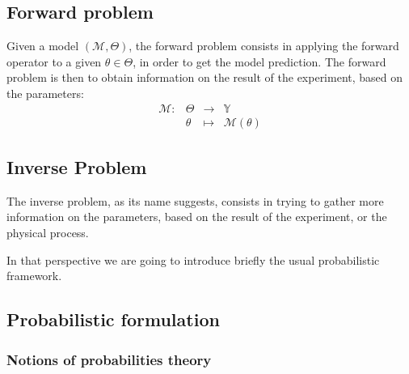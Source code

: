 \documentclass[a4paper,11pt]{article}
\newcommand{\Yspace}{\mathbb{Y}}
\theoremstyle{defi}
\numberwithin{thmCounter}{section}
\begin{document}
\subsection{Forward problem}
Given a model $(\mathcal{M}, \Theta)$, the forward problem consists in applying the forward operator to a given $\theta \in \Theta$, in order to get the model prediction. The forward problem is then to obtain information on the result of the experiment, based on the parameters:
\begin{equation*}
  \begin{array}{cccc}
    \mathcal{M}:&\Theta&\longrightarrow & \Yspace \\
                & \theta & \longmapsto & \mathcal{M}(\theta)
  \end{array}
\end{equation*}

\subsection{Inverse Problem}
The inverse problem, as its name suggests, consists in trying to gather more information on the parameters, based on the result of the experiment, or the physical process.

In that perspective we are going to introduce briefly the usual probabilistic framework.
\subsection{Probabilistic formulation}

\subsubsection{Notions of probabilities theory}
\label{sec:notion_prob_theory}
\end{document}
